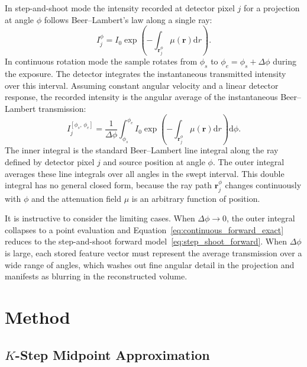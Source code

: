 \documentclass[12pt, a4paper, twoside]{report}
\begin{document}
In step-and-shoot mode the intensity recorded at detector pixel $j$ for a projection at angle $\phi$ follows Beer--Lambert's law along a single ray:
%
\begin{equation}
    I_j^{\phi} = I_0 \exp\!\left(-\int_{\mathbf{r}_j^{\phi}} \mu\!\left(\mathbf{r}\right) \mathrm{d}r\right).
    \label{eq:step_shoot_forward}
\end{equation}
%
In continuous rotation mode the sample rotates from $\phi_s$ to $\phi_e = \phi_s + \Delta\phi$ during the exposure. The detector integrates the instantaneous transmitted intensity over this interval. Assuming constant angular velocity and a linear detector response, the recorded intensity is the angular average of the instantaneous Beer--Lambert transmission:
%
\begin{equation}
    I_j^{[\phi_s,\,\phi_e]} = \frac{1}{\Delta\phi} \int_{\phi_s}^{\phi_e}
        I_0 \exp\!\left(-\int_{\mathbf{r}_j^{\phi}} \mu\!\left(\mathbf{r}\right) \mathrm{d}r\right)
    \mathrm{d}\phi.
    \label{eq:continuous_forward_exact}
\end{equation}
%
The inner integral is the standard Beer--Lambert line integral along the ray defined by detector pixel $j$ and source position at angle $\phi$. The outer integral averages these line integrals over all angles in the swept interval. This double integral has no general closed form, because the ray path $\mathbf{r}_j^{\phi}$ changes continuously with $\phi$ and the attenuation field $\mu$ is an arbitrary function of position.

It is instructive to consider the limiting cases. When $\Delta\phi \to 0$, the outer integral collapses to a point evaluation and Equation~\ref{eq:continuous_forward_exact} reduces to the step-and-shoot forward model~\ref{eq:step_shoot_forward}. When $\Delta\phi$ is large, each stored feature vector must represent the average transmission over a wide range of angles, which washes out fine angular detail in the projection and manifests as blurring in the reconstructed volume.


\section{Method}
\label{sec:cont_method}

\subsection{$K$-Step Midpoint Approximation}
\label{subsec:cont_kstep}
\end{document}
